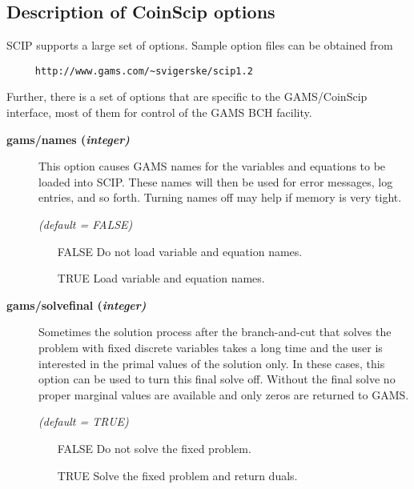 \subsection{Description of CoinScip options}

SCIP supports a large set of options.
Sample option files can be obtained from
\begin{verbatim}
     http://www.gams.com/~svigerske/scip1.2
\end{verbatim}

Further, there is a set of options that are specific to the GAMS/CoinScip interface, most of them for control of the GAMS BCH facility.

\begin{description}
\item[\label{scipnames}\hypertarget{scipnames}
{\textbf{gams/names (\slshape{integer})}}]\hspace{1.0in}

This option causes GAMS names for the variables and equations to be loaded into SCIP.
These names will then be used for error messages, log entries, and so forth.
Turning names off may help if memory is very tight.

\textsl{(default = FALSE)}
\begin{itemize}
\item[FALSE] Do not load variable and equation names.
\item[TRUE] Load variable and equation names.
\end{itemize}


\item[\label{scipsolvefinal}\hypertarget{scipsolvefinal}
{\textbf{gams/solvefinal (\slshape{integer})}}]\hspace{1.0in}

Sometimes the solution process after the branch-and-cut that solves the problem with fixed discrete variables takes a long time and the user is interested in the primal values of the solution only.
In these cases, this option can be used to turn this final solve off.
Without the final solve no proper marginal values are available and only zeros are returned to GAMS.

\textsl{(default = TRUE)}
\begin{itemize}
\item[FALSE] Do not solve the fixed problem.
\item[TRUE] Solve the fixed problem and return duals.
\end{itemize}



\end{description}
